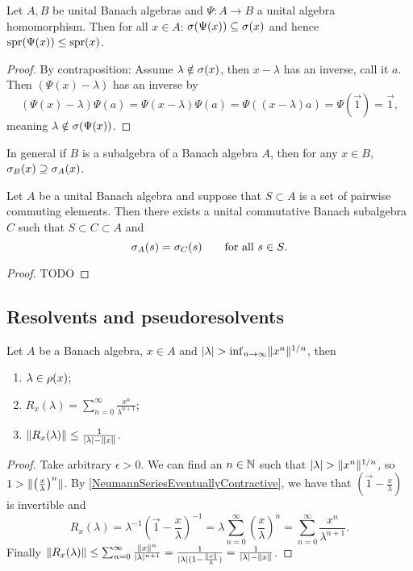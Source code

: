\begin{lemma} \label{spectrumOfImage}
Let $A,B$ be unital Banach algebras and $\Psi: A\to B$ a unital algebra homomorphism. Then for all $x\in A$: $\sigma(\Psi(x)) \subseteq \sigma(x)$ and hence $\operatorname{spr}(\Psi(x)) \leq \operatorname{spr}(x)$.
\end{lemma}
\begin{proof}
By contraposition: Assume $\lambda\notin\sigma(x)$, then $x-\lambda$ has an inverse, call it $a$. Then $(\Psi(x) - \lambda)$ has an inverse by
\[ (\Psi(x) - \lambda)\Psi(a) = \Psi(x-\lambda)\Psi(a) = \Psi((x-\lambda)a) = \Psi(\vec{1}) = \vec{1},\]
meaning $\lambda \notin \sigma(\Psi(x))$.
\end{proof}

In general if $B$ is a subalgebra of a Banach algebra $A$, then for any $x\in B$, $\sigma_B(x) \supseteq \sigma_A(x)$.

\begin{proposition}
Let $A$ be a unital Banach algebra and suppose that $S\subset A$ is a set of pairwise commuting elements. Then there exists a unital commutative Banach subalgebra $C$ such that $S\subset C\subset A$ and
\[ \sigma_A(s) = \sigma_C(s) \qquad \text{for all $s\in S$.} \]
\end{proposition}
\begin{proof}
TODO
\end{proof}


\subsection{Resolvents and pseudoresolvents}

\begin{proposition} \label{secondNeumannSeries}
Let $A$ be a Banach algebra, $x\in A$ and $|\lambda| > \inf_{n\to \infty}\lVert x^n\rVert^{1/n}$, then
\begin{enumerate}
\item $\lambda\in\rho(x)$;
\item $R_x(\lambda) = \sum_{n=0}^\infty\frac{x^n}{\lambda^{n+1}}$;
\item $\lVert R_x(\lambda)\rVert \leq \frac{1}{|\lambda|-\lVert x\rVert}$.
\end{enumerate}
\end{proposition}
\begin{proof}
Take arbitrary $\epsilon > 0$. We can find an $n\in\mathbb{N}$ such that $|\lambda| > \lVert x^n\rVert^{1/n}$, so $1 > \lVert\left(\frac{x}{\lambda}\right)^n\rVert$. By \ref{NeumannSeriesEventuallyContractive}, we have that $(\vec{1} - \frac{x}{\lambda})$ is invertible and
\[ R_x(\lambda) = \lambda^{-1} \left(\vec{1} - \frac{x}{\lambda}\right)^{-1} = \lambda \sum_{n=0}^\infty\left(\frac{x}{\lambda}\right)^n = \sum_{n=0}^\infty\frac{x^n}{\lambda^{n+1}}. \]
Finally $\lVert R_x(\lambda)\rVert \leq \sum_{n=0}^\infty\frac{\lVert x\rVert^n}{|\lambda|^{n+1}} = \frac{1}{|\lambda|(1-\frac{\lVert x\rVert}{\lambda})} = \frac{1}{|\lambda|-\lVert x\rVert}$.
\end{proof}

